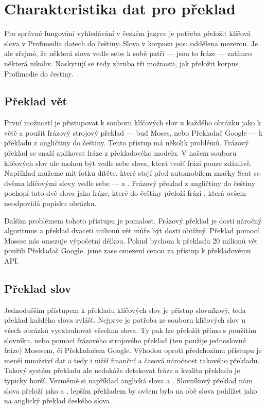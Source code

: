 \section{Charakteristika dat pro překlad}

Pro správné fungování vyhledávání v českém jazyce je potřeba přeložit klíčová slova v Profimedia datech do češtiny. Slova v korpusu jsou oddělena mezerou. Je ale zřejmé, že některá slova vedle sebe k sobě patří --- jsou to fráze --- zatímco některá nikoliv. Naskytují se tedy zhruba tři možnosti, jak přeložit korpus Profimedie do čestiny.


\subsection{Překlad vět}

První možností je přistupovat k souboru klíčových slov u každého obrázku jako k větě a použít frázový strojový překlad --- buď Moses, nebo Překladač Google --- k překladu z angličtiny do češtiny. Tento přístup má několik problémů. Frázový překlad se snaží aplikovat fráze z překladového modelu. V našem souboru klíčových slov ale mohou být vedle sebe slova, která tvoří frázi pouze zdánlivě. Například můžeme mít fotku dítěte, které stojí před automobilem značky Seat se dvěma klíčovými slovy vedle sebe ---  a . Frázový překlad z angličtiny do češtiny pochopí tato dvě slova jako fráze, které do češtiny přeloží frází , která ovšem neodpovídá popisku obrázku.

Dalším problémem tohoto přístupu je pomalost. Frázový překlad je dosti náročný algoritmus a překlad dvaceti milionů vět můře být dosti obtížný. Překlad pomocí Mosese nás omezuje výpočetní délkou. Pokud bychom k překladu 20 milionů vět použili Překladač Google, jsme zase omezení cenou za přístup k překladovému API.

\subsection{Překlad slov}

Jednodušším přístupem k překladu klíčových slov je přístup slovníkový, teda překlad každého slova zvlášť. Nejprve je potřeba ze souboru klíčových slov u všech obrázků vyextrahovat všechna slova. Ty pak lze přeložit přímo s použitím slovníku, nebo pomocí frázového strojového překlad (ten použije jednoslovné fráze) Mosesem, či Překladačem Google. Výhodou oproti předchozímu přístupu je menší množství dat a tedy i nižší finanční a časová náročnost takového překladu. Takový systém překladu ale nedokáže detekovat fráze a kvalita překladu je  typicky horší. Vezměmě si například anglická slova  a . Slovníkový překlad nám slova přeloží jako  a , lepším překladem by ovšem bylo na obě slova pohlížet jako na anglický překlad českého slova .

